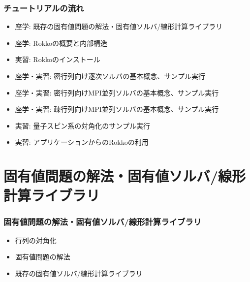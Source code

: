 \begin{frame}
  \frametitle{チュートリアルの流れ}
  \begin{itemize}
  \item 座学: 既存の固有値問題の解法・固有値ソルバ/線形計算ライブラリ
  \item 座学: Rokkoの概要と内部構造
  \item 実習: Rokkoのインストール
  \item 座学・実習: 密行列向け逐次ソルバの基本概念、サンプル実行
  \item 座学・実習: 密行列向けMPI並列ソルバの基本概念、サンプル実行
  \item 座学・実習: 疎行列向けMPI並列ソルバの基本概念、サンプル実行
  \item 実習: 量子スピン系の対角化のサンプル実行
  \item 実習: アプリケーションからのRokkoの利用
  \end{itemize}
\end{frame}


\section{固有値問題の解法・固有値ソルバ/線形計算ライブラリ}

\begin{frame}
  \frametitle{固有値問題の解法・固有値ソルバ/線形計算ライブラリ}
  \begin{itemize}
    \setlength{\itemsep}{1em}
  \item 行列の対角化
  \item 固有値問題の解法
  \item 既存の固有値ソルバ/線形計算ライブラリ
  \end{itemize}
\end{frame}

